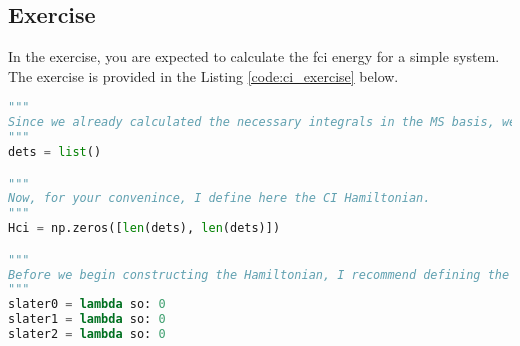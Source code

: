 \subsection{Exercise}

In the exercise, you are expected to calculate the \acrshort{fci} energy for a simple system. The exercise is provided in the Listing \ref{code:ci_exercise} below.

\raggedbottom\begin{lstlisting}[language=Python, caption={\acrshort{ci} exercise code.}, label=code:ci_exercise]
"""
Since we already calculated the necessary integrals in the MS basis, we can proceed. The next step involves generating determinants. We will store these in a simple list, with each determinant represented by an array of numbers, where each number corresponds to an occupied spinorbital. Since we are programming for Full Configuration Interaction (FCI), we aim to generate all possible determinants. However, should we decide to implement methods like CIS, CID, or CISD, we could easily limit the number of excitations. It is important to remember that for all CI methods, the rest of the code remains unchanged. The only difference lies in the determinants used. Don't overcomplicate this. Generating all possible determinants can be efficiently achieved using a simple list comprehension. I recommend employing the combinations function from the itertools package to facilitate this task.
"""
dets = list()

"""
Now, for your convenince, I define here the CI Hamiltonian.
"""
Hci = np.zeros([len(dets), len(dets)])

"""
Before we begin constructing the Hamiltonian, I recommend defining the Slater-Condon rules. Let's consider that the input for these functions will be an array of spinorbitals, segmented into unique and common ones. A practical approach might be to arrange this 1D array with all unique spinorbitals at the front, followed by the common spinorbitals. This arrangement allows you to easily determine the number of unique spinorbitals based on the rule being applied, meaning you will always know how many entries at the beginning of the array are unique spinorbitals. While you can develop your own method for managing this array, I will proceed under the assumption that the Slater-Condon rules we use will take a single array of spinorbitals and return an unsigned matrix element. The sign of this element will be corrected later in the script. For simplicity and flexibility, I'll define these rules using lambda functions, but you're welcome to expand them into full functions if you prefer.
"""
slater0 = lambda so: 0
slater1 = lambda so: 0
slater2 = lambda so: 0


\end{lstlisting}
